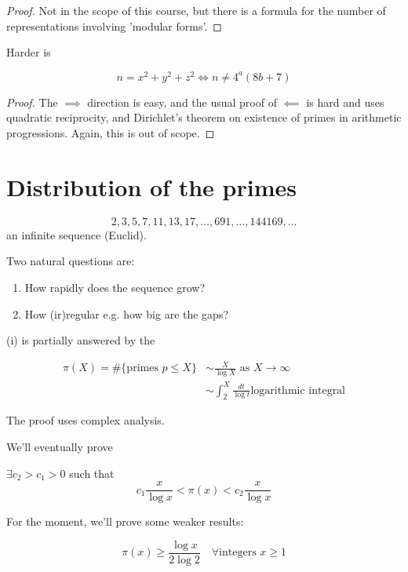\documentclass{article}
\begin{document}
\begin{proof}
    Not in the scope of this course, but there is a formula for the number of representations involving 'modular forms'.
\end{proof}

Harder is
\begin{thm}[1797, Legendre]
    \begin{equation*}
        n = x^2 + y^2 + z^2 \iff n \neq 4^a (8b + 7)
    \end{equation*}
\end{thm}

\begin{proof}
    The $\implies$ direction is easy, and the usual proof of $\impliedby$ is hard and uses quadratic reciprocity, and Dirichlet's theorem on existence of primes in arithmetic progressions. Again, this is out of scope.
\end{proof}

\clearpage
\section{Distribution of the primes}
\begin{equation*}
    2, 3, 5, 7, 11, 13, 17, \dotsc, 691, \dotsc, 144169, \dotsc
\end{equation*}
an infinite sequence (Euclid).

Two natural questions are:
\begin{enumerate}
    \item How rapidly does the sequence grow?
    \item How (ir)regular e.g. how big are the gaps?
\end{enumerate}

(i) is partially answered by the
\begin{thm}
    \begin{align*}
        \pi(X) = \#\{\text{primes } p \leq X\} &\sim \frac{X}{\log X} \text{ as } X \to \infty \\
                                               &\sim \int_2^X \frac{dt}{\log t} \text{logarithmic integral}
    \end{align*}
\end{thm}
The proof uses complex analysis.

We'll eventually prove
\begin{thm}
    $\exists c_2 > c_1 > 0$ such that
    \begin{equation*}
        c_1 \frac{x}{\log x} < \pi(x) < c_2 \frac{x}{\log x}
    \end{equation*}
\end{thm}
For the moment, we'll prove some weaker results:
\begin{nlemma}\label{lem:5.1}
    \begin{equation*}
        \pi(x) \geq \frac{\log x}{2 \log 2} \quad \forall \text{integers } x \geq 1
    \end{equation*}
\end{nlemma}
\end{document}
